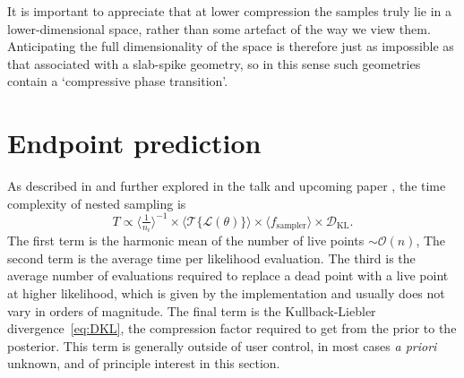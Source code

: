 \documentclass[usenatbib]{mnras}
\newcommand{\nlive}{n_i}
\newcommand{\Like}{\mathcal{L}}
\newcommand{\DKL}{\mathcal{D}_\mathrm{KL}}
\begin{document}
\par
It is important to appreciate that at lower compression the samples truly lie in a lower-dimensional space, rather than some artefact of the way we view them. Anticipating the full dimensionality of the space is therefore just as impossible as that associated with a slab-spike geometry, so in this sense such geometries contain a `compressive phase transition'. 

\section{Endpoint prediction}\label{sec:endpoint}
As described in \citet{supernest} and further explored in the talk and upcoming paper \citet{kcl_talk, scaling_frontier}, the time complexity of nested sampling is
\begin{equation}
    T \propto \langle \tfrac{1}{\nlive} \rangle^{-1} \times \langle \mathcal{T}\{ \Like(\theta) \} \rangle \times \langle f_\mathrm{sampler} \rangle \times \DKL.
\end{equation}
The first term is the harmonic mean of the number of live points $\sim\mathcal{O}(n)$, The second term is the average time per likelihood evaluation. The third is the average number of evaluations required to replace a dead point with a live point at higher likelihood, which is given by the implementation and usually does not vary in orders of magnitude. 
The final term is the Kullback-Liebler divergence~\cref{eq:DKL}, the compression factor required to get from the prior to the posterior. This term is generally outside of user control, in most cases \textit{a priori} unknown, and of principle interest in this section.
\end{document}
